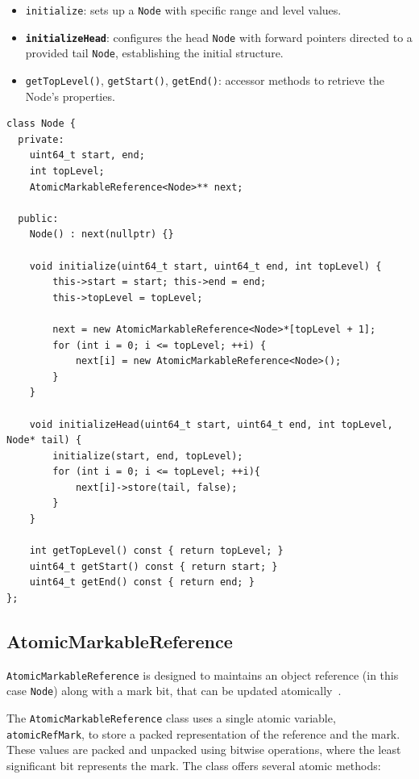 \begin{itemize}
    \item \texttt{initialize}: sets up a \texttt{Node} with specific range and level values.
    \item \textbf{\texttt{initializeHead}}: configures the head \texttt{Node} with forward pointers directed to a provided tail \texttt{Node}, establishing the initial structure.
    \item \texttt{getTopLevel()}, \texttt{getStart()}, \texttt{getEnd()}: accessor methods to retrieve the Node's properties.
\end{itemize}

\vspace{15pt}

\begin{lstlisting}[style=mystyle, caption=Node class implementation,label={}]
class Node {
  private:
    uint64_t start, end;
    int topLevel;
    AtomicMarkableReference<Node>** next;

  public:
    Node() : next(nullptr) {}

    void initialize(uint64_t start, uint64_t end, int topLevel) {
        this->start = start; this->end = end;
        this->topLevel = topLevel;

        next = new AtomicMarkableReference<Node>*[topLevel + 1];
        for (int i = 0; i <= topLevel; ++i) {
            next[i] = new AtomicMarkableReference<Node>();
        }
    }

    void initializeHead(uint64_t start, uint64_t end, int topLevel, Node* tail) {
        initialize(start, end, topLevel);
        for (int i = 0; i <= topLevel; ++i){
            next[i]->store(tail, false);
        }
    }

    int getTopLevel() const { return topLevel; }
    uint64_t getStart() const { return start; }
    uint64_t getEnd() const { return end; }
};
\end{lstlisting}

\subsection{AtomicMarkableReference} \label{subsec:atomicmarkablereference}

\texttt{AtomicMarkableReference} is designed to maintains an object reference (in this case \texttt{Node}) along with a mark bit, that can be updated atomically~\parencite{atomicMarkableReference}.

The \texttt{AtomicMarkableReference} class uses a single atomic variable, \texttt{atomicRefMark}, to store a packed representation of the reference and the mark.
These values are packed and unpacked using bitwise operations, where the least significant bit represents the mark.
The class offers several atomic methods:

